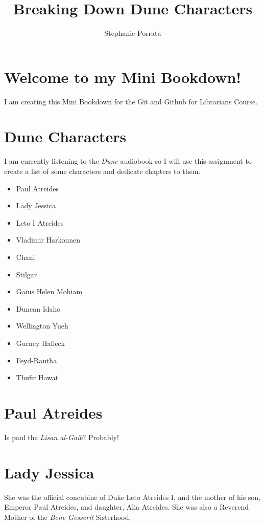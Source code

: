 \documentclass[
  openany]{book}
\title{Breaking Down Dune Characters}
\author{Stephanie Porrata}
\date{}
\providecommand{\tightlist}{%
  \setlength{\itemsep}{0pt}\setlength{\parskip}{0pt}}
\begin{document}
\maketitle

{
\setcounter{tocdepth}{1}
\tableofcontents
}
\hypertarget{welcome-to-my-mini-bookdown}{%
\chapter{Welcome to my Mini Bookdown!}\label{welcome-to-my-mini-bookdown}}

I am creating this Mini Bookdown for the Git and Github for Librarians Course.

\hypertarget{dune-characters}{%
\chapter{Dune Characters}\label{dune-characters}}

I am currently listening to the \emph{Dune} audiobook so I will use this assignment to create a list of some characters and dedicate chapters to them.

\begin{itemize}
\tightlist
\item
  Paul Atreides
\item
  Lady Jessica
\item
  Leto I Atreides
\item
  Vladimir Harkonnen
\item
  Chani
\item
  Stilgar
\item
  Gaius Helen Mohiam
\item
  Duncan Idaho
\item
  Wellington Yueh
\item
  Gurney Halleck
\item
  Feyd-Rautha
\item
  Thufir Hawat
\end{itemize}

\hypertarget{paul-atreides}{%
\chapter{Paul Atreides}\label{paul-atreides}}

Is paul the \emph{Lisan al-Gaib}? Probably!

\hypertarget{lady-jessica}{%
\chapter{Lady Jessica}\label{lady-jessica}}

She was the official concubine of Duke Leto Atreides I, and the mother of his son, Emperor Paul Atreides, and daughter, Alia Atreides. She was also a Reverend Mother of the \emph{Bene Gesserit} Sisterhood.
\end{document}
